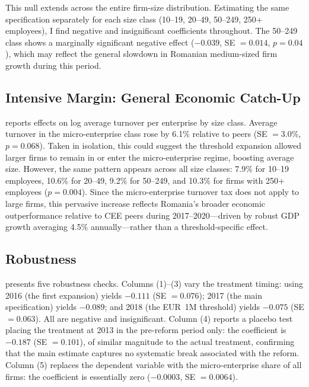 \documentclass[12pt]{article}
\begin{document}
This null extends across the entire firm-size distribution. Estimating the same specification separately for each size class (10--19, 20--49, 50--249, 250+ employees), I find negative and insignificant coefficients throughout. The 50--249 class shows a marginally significant negative effect ($-0.039$, SE $= 0.014$, $p = 0.04$), which may reflect the general slowdown in Romanian medium-sized firm growth during this period.

\subsection{Intensive Margin: General Economic Catch-Up}



 reports effects on log average turnover per enterprise by size class. Average turnover in the micro-enterprise class rose by 6.1\% relative to peers (SE $= 3.0$\%, $p = 0.068$). Taken in isolation, this could suggest the threshold expansion allowed larger firms to remain in or enter the micro-enterprise regime, boosting average size. However, the same pattern appears across all size classes: 7.9\% for 10--19 employees, 10.6\% for 20--49, 9.2\% for 50--249, and 10.3\% for firms with 250+ employees ($p = 0.004$). Since the micro-enterprise turnover tax does not apply to large firms, this pervasive increase reflects Romania's broader economic outperformance relative to CEE peers during 2017--2020---driven by robust GDP growth averaging 4.5\% annually---rather than a threshold-specific effect.

\subsection{Robustness}



 presents five robustness checks. Columns (1)--(3) vary the treatment timing: using 2016 (the first expansion) yields $-0.111$ (SE $= 0.076$); 2017 (the main specification) yields $-0.089$; and 2018 (the EUR~1M threshold) yields $-0.075$ (SE $= 0.063$). All are negative and insignificant. Column (4) reports a placebo test placing the treatment at 2013 in the pre-reform period only: the coefficient is $-0.187$ (SE $= 0.101$), of similar magnitude to the actual treatment, confirming that the main estimate captures no systematic break associated with the reform. Column (5) replaces the dependent variable with the micro-enterprise share of all firms: the coefficient is essentially zero ($-0.0003$, SE $= 0.0064$).
\end{document}
